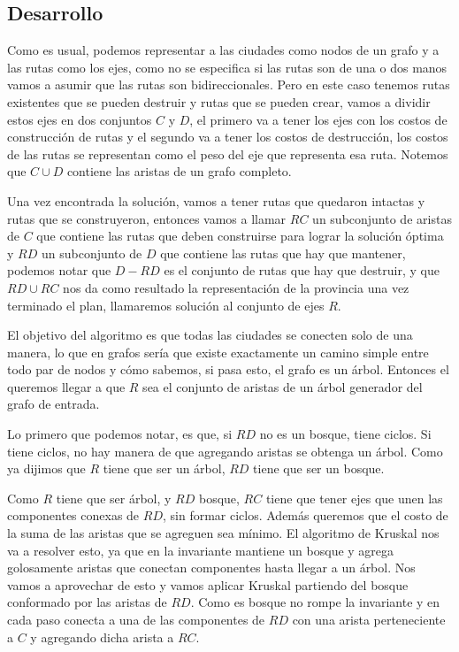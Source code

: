 \subsection{Desarrollo}
Como es usual, podemos representar a las ciudades como nodos de un grafo y a las rutas como los ejes, como no se especifica si las rutas son de una o dos manos vamos a asumir que las rutas son bidireccionales. Pero en este caso tenemos rutas existentes que se pueden destruir y rutas que se pueden crear, vamos a dividir estos ejes en dos conjuntos $C$ y $D$, el primero va a tener los ejes con los costos de construcción de rutas y el segundo va a tener los costos de destrucción, los costos de las rutas se representan como el peso del eje que representa esa ruta. Notemos que $C \cup D$ contiene las aristas de un grafo completo.
\\
\par
Una vez encontrada la solución, vamos a tener rutas que quedaron intactas y rutas que se construyeron, entonces vamos a llamar $RC$ un subconjunto de aristas de $C$ que contiene las rutas que deben construirse para lograr la solución óptima y $RD$ un subconjunto de $D$ que contiene las rutas que hay que mantener, podemos notar que $D - RD$ es el conjunto de rutas que hay que destruir, y que $RD \cup RC$ nos da como resultado la representación de la provincia una vez terminado el plan, llamaremos solución al conjunto de ejes $R$. 
\\
\par
El objetivo del algoritmo es que todas las ciudades se conecten solo de una manera, lo que en grafos sería que existe exactamente un camino simple entre todo par de
nodos y cómo sabemos, si pasa esto, el grafo es un árbol. Entonces el queremos llegar a que $R$ sea el conjunto de aristas de un árbol generador del grafo de entrada. 
\\
\par
Lo primero que podemos notar, es que, si $RD$ no es un bosque, tiene ciclos. Si tiene ciclos, no hay manera de que agregando aristas se obtenga un árbol. Como ya dijimos que $R$ tiene que ser un árbol, $RD$ tiene que ser un bosque.
\\
\par
Como $R$ tiene que ser árbol, y $RD$ bosque, $RC$ tiene que tener ejes que unen las componentes conexas de $RD$, sin formar ciclos.  Además queremos que el costo de la suma de las aristas que se agreguen sea mínimo. El algoritmo de Kruskal nos va a resolver esto, ya que en la invariante mantiene un bosque y agrega golosamente aristas que conectan componentes hasta llegar a un árbol. Nos vamos a aprovechar de esto y vamos aplicar Kruskal partiendo del bosque conformado por las aristas de $RD$. Como es bosque no rompe la invariante y en cada paso conecta a una de las componentes de $RD$ con una arista perteneciente a $C$ y agregando dicha arista a $RC$.
